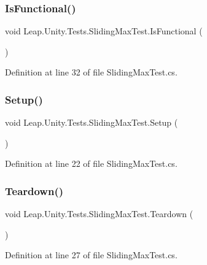 \subsubsection{\texorpdfstring{IsFunctional()}{IsFunctional()}}
{\footnotesize\ttfamily void Leap.\+Unity.\+Tests.\+Sliding\+Max\+Test.\+Is\+Functional (\begin{DoxyParamCaption}{ }\end{DoxyParamCaption})}



Definition at line 32 of file Sliding\+Max\+Test.\+cs.

\mbox{\label{class_leap_1_1_unity_1_1_tests_1_1_sliding_max_test_a060541dd6a108d4af8f2e15fb42e394b}} 
\subsubsection{\texorpdfstring{Setup()}{Setup()}}
{\footnotesize\ttfamily void Leap.\+Unity.\+Tests.\+Sliding\+Max\+Test.\+Setup (\begin{DoxyParamCaption}{ }\end{DoxyParamCaption})}



Definition at line 22 of file Sliding\+Max\+Test.\+cs.

\mbox{\label{class_leap_1_1_unity_1_1_tests_1_1_sliding_max_test_a129fcc36c99499c4b33a2706da21f501}} 
\subsubsection{\texorpdfstring{Teardown()}{Teardown()}}
{\footnotesize\ttfamily void Leap.\+Unity.\+Tests.\+Sliding\+Max\+Test.\+Teardown (\begin{DoxyParamCaption}{ }\end{DoxyParamCaption})}



Definition at line 27 of file Sliding\+Max\+Test.\+cs.



